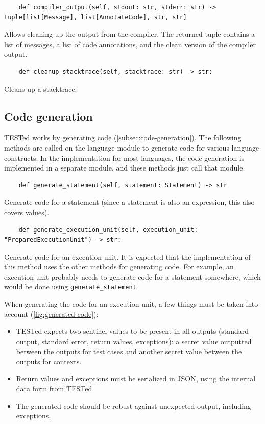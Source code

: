 \documentclass[../main]{subfiles}
\begin{document}
\begin{verbatim}
    def compiler_output(self, stdout: str, stderr: str) -> tuple[list[Message], list[AnnotateCode], str, str]
\end{verbatim}

Allows cleaning up the output from the compiler.
The returned tuple contains a list of messages, a list of code annotations, and the clean version of the compiler output.

\begin{verbatim}
    def cleanup_stacktrace(self, stacktrace: str) -> str:
\end{verbatim}

Cleans up a stacktrace.

\subsection{Code generation}\label{subsec:code-generation2}

TESTed works by generating code (\cref{subsec:code-generation}).
The following methods are called on the language module to generate code for various language constructs.
In the implementation for most languages, the code generation is implemented in a separate module, and these methods just call that module.

\begin{verbatim}
    def generate_statement(self, statement: Statement) -> str
\end{verbatim}

Generate code for a statement (since a statement is also an expression, this also covers values).

\begin{verbatim}
    def generate_execution_unit(self, execution_unit: "PreparedExecutionUnit") -> str:
\end{verbatim}

Generate code for an execution unit.
It is expected that the implementation of this method uses the other methods for generating code.
For example, an execution unit probably needs to generate code for a statement somewhere, which would be done using \texttt{generate_statement}.

When generating the code for an execution unit, a few things must be taken into account (\cref{fig:generated-code}):

\begin{itemize}
    \item TESTed expects two sentinel values to be present in all outputs (standard output, standard error, return values, exceptions): a secret value outputted between the outputs for test cases and another secret value between the outputs for contexts.
    \item Return values and exceptions must be serialized in JSON, using the internal data form from TESTed.
    \item The generated code should be robust against unexpected output, including exceptions.
\end{itemize}
\end{document}
